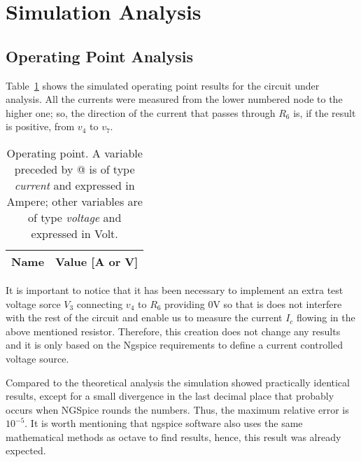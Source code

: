 \section{Simulation Analysis }
\label{sec:simulation}

\subsection{Operating Point Analysis}


Table~\ref{tab:op} shows the simulated operating point results for the circuit under analysis. All the currents were measured from the lower numbered node to the higher one; so, the direction of the current that passes through $R_6$ is, if the result is positive, from $v_4$ to $v_7$.


\begin{table}[h]
  \centering
  \begin{tabular}{|l|r|}
    \hline    
    {\bf Name} & {\bf Value [A or V]} \\ \hline
    
  \end{tabular}
  \caption{Operating point. A variable preceded by @ is of type {\em current}
    and expressed in Ampere; other variables are of type {\it voltage} and expressed in
    Volt.}
  \label{tab:op}
\end{table}

It is important to notice that it has been necessary to implement an extra test voltage sorce $V_3$ connecting $v_4$ to $R_6$ providing 0V so that is does not interfere with the rest of the circuit and enable us to measure the current $I_c$ flowing in the above mentioned resistor. Therefore, this creation does not change any results and it is only based on the Ngspice requirements to define a current controlled voltage source.

Compared to the theoretical analysis the simulation showed practically identical results, except for a small divergence in the last decimal place that probably occurs when NGSpice rounds the numbers. Thus, the maximum relative error is $10^{-5}$.
It is worth mentioning that ngspice software also uses the same mathematical methods as octave to find results, hence, this result was already expected.










